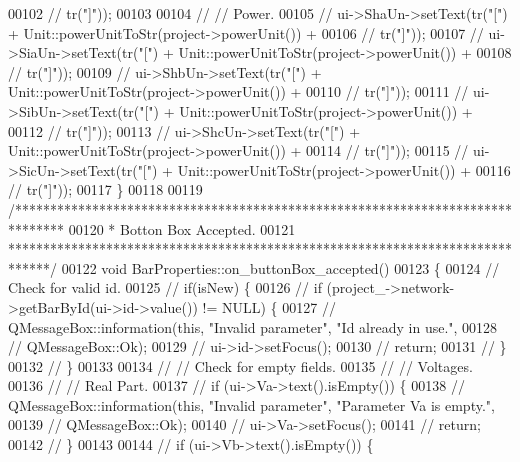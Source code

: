 \begin{DoxyCode}
00102 \textcolor{comment}{//                    tr("]"));}
00103 
00104 \textcolor{comment}{//  // Power.}
00105 \textcolor{comment}{//  ui->ShaUn->setText(tr("[") + Unit::powerUnitToStr(project->powerUnit()) +}
00106 \textcolor{comment}{//                     tr("]"));}
00107 \textcolor{comment}{//  ui->SiaUn->setText(tr("[") + Unit::powerUnitToStr(project->powerUnit()) +}
00108 \textcolor{comment}{//                     tr("]"));}
00109 \textcolor{comment}{//  ui->ShbUn->setText(tr("[") + Unit::powerUnitToStr(project->powerUnit()) +}
00110 \textcolor{comment}{//                     tr("]"));}
00111 \textcolor{comment}{//  ui->SibUn->setText(tr("[") + Unit::powerUnitToStr(project->powerUnit()) +}
00112 \textcolor{comment}{//                     tr("]"));}
00113 \textcolor{comment}{//  ui->ShcUn->setText(tr("[") + Unit::powerUnitToStr(project->powerUnit()) +}
00114 \textcolor{comment}{//                     tr("]"));}
00115 \textcolor{comment}{//  ui->SicUn->setText(tr("[") + Unit::powerUnitToStr(project->powerUnit()) +}
00116 \textcolor{comment}{//                     tr("]"));}
00117 \}
00118 
00119 \textcolor{comment}{/*******************************************************************************}
00120 \textcolor{comment}{ * Botton Box Accepted.}
00121 \textcolor{comment}{ ******************************************************************************/}
00122 \textcolor{keywordtype}{void} BarProperties::on\_buttonBox\_accepted()
00123 \{
00124   \textcolor{comment}{// Check for valid id.}
00125 \textcolor{comment}{//  if(isNew) \{}
00126 \textcolor{comment}{//    if (project\_->network->getBarById(ui->id->value()) != NULL) \{}
00127 \textcolor{comment}{//      QMessageBox::information(this, "Invalid parameter", "Id already in use.",}
00128 \textcolor{comment}{//                               QMessageBox::Ok);}
00129 \textcolor{comment}{//      ui->id->setFocus();}
00130 \textcolor{comment}{//      return;}
00131 \textcolor{comment}{//    \}}
00132 \textcolor{comment}{//  \}}
00133 
00134 \textcolor{comment}{//  // Check for empty fields.}
00135 \textcolor{comment}{//  // Voltages.}
00136 \textcolor{comment}{//  // Real Part.}
00137 \textcolor{comment}{//  if (ui->Va->text().isEmpty()) \{}
00138 \textcolor{comment}{//    QMessageBox::information(this, "Invalid parameter", "Parameter Va is empty.",}
00139 \textcolor{comment}{//                             QMessageBox::Ok);}
00140 \textcolor{comment}{//    ui->Va->setFocus();}
00141 \textcolor{comment}{//    return;}
00142 \textcolor{comment}{//  \}}
00143 
00144 \textcolor{comment}{//  if (ui->Vb->text().isEmpty()) \{}

\end{DoxyCode}
